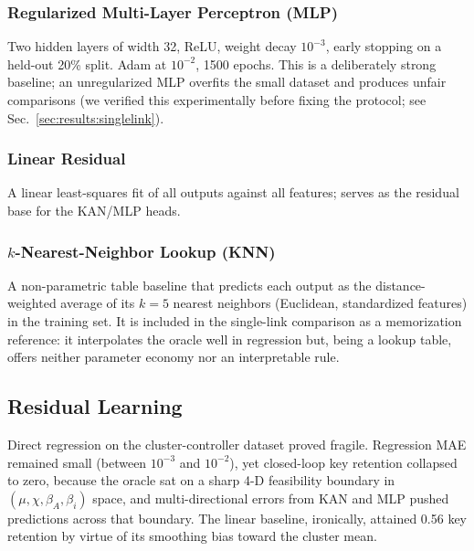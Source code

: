 \subsubsection{Regularized Multi-Layer Perceptron (MLP)}
Two hidden layers of width 32, ReLU, weight decay $10^{-3}$, early stopping on a held-out 20\% split. Adam at $10^{-2}$, 1500 epochs. This is a deliberately strong baseline; an unregularized MLP overfits the small dataset and produces unfair comparisons (we verified this experimentally before fixing the protocol; see Sec.~\ref{sec:results:singlelink}).

\subsubsection{Linear Residual}
A linear least-squares fit of all outputs against all features; serves as the residual base for the KAN/MLP heads.

\subsubsection{$k$-Nearest-Neighbor Lookup (KNN)}
A non-parametric table baseline that predicts each output as the distance-weighted average of its $k{=}5$ nearest neighbors (Euclidean, standardized features) in the training set. It is included in the single-link comparison as a memorization reference: it interpolates the oracle well in regression but, being a lookup table, offers neither parameter economy nor an interpretable rule.

\subsection{Residual Learning}

Direct regression on the cluster-controller dataset proved fragile. Regression MAE remained small (between $10^{-3}$ and $10^{-2}$), yet closed-loop key retention collapsed to zero, because the oracle sat on a sharp 4-D feasibility boundary in $(\mu, \chi, \beta_A, \beta_i)$ space, and multi-directional errors from KAN and MLP pushed predictions across that boundary. The linear baseline, ironically, attained 0.56 key retention by virtue of its smoothing bias toward the cluster mean.

